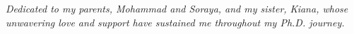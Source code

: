 \begin{center}
\textit{Dedicated to my parents, Mohammad and Soraya, and my sister, Kiana, whose unwavering love and support have sustained me throughout my Ph.D. journey.}
\end{center}
